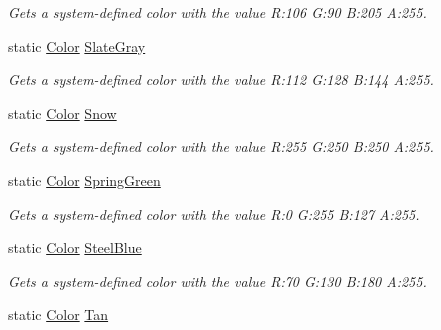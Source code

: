 \begin{DoxyCompactItemize}
\begin{DoxyCompactList}\small\item\em Gets a system-\/defined color with the value R\+:106 G\+:90 B\+:205 A\+:255.\end{DoxyCompactList}\item 
static \hyperlink{structMicrosoft_1_1Xna_1_1Framework_1_1Color}{Color} \hyperlink{structMicrosoft_1_1Xna_1_1Framework_1_1Color_a66808c67c15816890404de88552761d7}{Slate\+Gray}
\begin{DoxyCompactList}\small\item\em Gets a system-\/defined color with the value R\+:112 G\+:128 B\+:144 A\+:255.\end{DoxyCompactList}\item 
static \hyperlink{structMicrosoft_1_1Xna_1_1Framework_1_1Color}{Color} \hyperlink{structMicrosoft_1_1Xna_1_1Framework_1_1Color_a1d6e122b3cf6f2f9f0a938d7cca90b35}{Snow}
\begin{DoxyCompactList}\small\item\em Gets a system-\/defined color with the value R\+:255 G\+:250 B\+:250 A\+:255.\end{DoxyCompactList}\item 
static \hyperlink{structMicrosoft_1_1Xna_1_1Framework_1_1Color}{Color} \hyperlink{structMicrosoft_1_1Xna_1_1Framework_1_1Color_acffb92f90662fbdbda991d007007e3b9}{Spring\+Green}
\begin{DoxyCompactList}\small\item\em Gets a system-\/defined color with the value R\+:0 G\+:255 B\+:127 A\+:255.\end{DoxyCompactList}\item 
static \hyperlink{structMicrosoft_1_1Xna_1_1Framework_1_1Color}{Color} \hyperlink{structMicrosoft_1_1Xna_1_1Framework_1_1Color_a305f27f14c294ea48e4f96c66c3b4505}{Steel\+Blue}
\begin{DoxyCompactList}\small\item\em Gets a system-\/defined color with the value R\+:70 G\+:130 B\+:180 A\+:255.\end{DoxyCompactList}\item 
static \hyperlink{structMicrosoft_1_1Xna_1_1Framework_1_1Color}{Color} \hyperlink{structMicrosoft_1_1Xna_1_1Framework_1_1Color_ae2cc25b26cf45fc36820fd18b74b8ecd}{Tan}

\end{DoxyCompactItemize}
